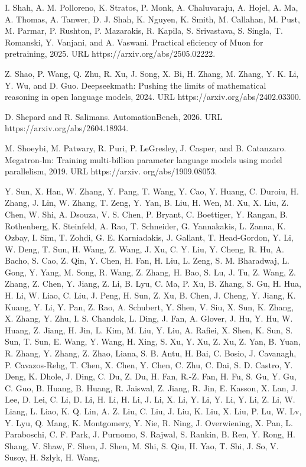 \documentclass[
  10
]{article}
\begin{document}
I. Shah, A. M. Polloreno, K. Stratos, P. Monk, A. Chaluvaraju, A. Hojel,
A. Ma, A. Thomas, A. Tanwer, D. J. Shah, K. Nguyen, K. Smith, M.
Callahan, M. Pust, M. Parmar, P. Rushton, P. Mazarakis, R. Kapila, S.
Srivastava, S. Singla, T. Romanski, Y. Vanjani, and A. Vaswani.
Practical eficiency of Muon for pretraining, 2025. URL
https://arxiv.org/abs/2505.02222.

Z. Shao, P. Wang, Q. Zhu, R. Xu, J. Song, X. Bi, H. Zhang, M. Zhang, Y.
K. Li, Y. Wu, and D. Guo. Deepseekmath: Pushing the limits of
mathematical reasoning in open language models, 2024. URL
https://arxiv.org/abs/2402.03300.

D. Shepard and R. Salimans. AutomationBench, 2026. URL
https://arxiv.org/abs/2604.18934.

M. Shoeybi, M. Patwary, R. Puri, P. LeGresley, J. Casper, and B.
Catanzaro. Megatron-lm: Training multi-billion parameter language models
using model parallelism, 2019. URL https://arxiv. org/abs/1909.08053.

Y. Sun, X. Han, W. Zhang, Y. Pang, T. Wang, Y. Cao, Y. Huang, C. Duroiu,
H. Zhang, J. Lin, W. Zhang, T. Zeng, Y. Yan, B. Liu, H. Wen, M. Xu, X.
Liu, Z. Chen, W. Shi, A. Dsouza, V. S. Chen, P. Bryant, C. Boettiger, Y.
Rangan, B. Rothenberg, K. Steinfeld, A. Rao, T. Schneider, G.
Yannakakis, L. Zanna, K. Ozbay, I. Sim, T. Zohdi, G. E. Karniadakis, J.
Gallant, T. Head-Gordon, Y. Li, W. Deng, T. Sun, H. Wang, Z. Wang, J.
Xu, C. Y. Liu, Y. Cheng, R. Hu, A. Bacho, S. Cao, Z. Qin, Y. Chen, H.
Fan, H. Liu, L. Zeng, S. M. Bharadwaj, L. Gong, Y. Yang, M. Song, R.
Wang, Z. Zhang, H. Bao, S. Lu, J. Tu, Z. Wang, Z. Zhang, Z. Chen, Y.
Jiang, Z. Li, B. Lyu, C. Ma, P. Xu, B. Zhang, S. Gu, H. Hua, H. Li, W.
Liao, C. Liu, J. Peng, H. Sun, Z. Xu, B. Chen, J. Cheng, Y. Jiang, K.
Kuang, Y. Li, Y. Pan, Z. Rao, A. Schubert, Y. Shen, V. Siu, X. Sun, K.
Zhang, X. Zhang, Y. Zhu, I. S. Chandok, L. Ding, J. Fan, A. Glover, J.
Hu, Y. Hu, W. Huang, Z. Jiang, H. Jin, L. Kim, M. Liu, Y. Liu, A.
Rafiei, X. Shen, K. Sun, S. Sun, T. Sun, E. Wang, Y. Wang, H. Xing, S.
Xu, Y. Xu, Z. Xu, Z. Yan, B. Yuan, R. Zhang, Y. Zhang, Z. Zhao, Liana,
S. B. Antu, H. Bai, C. Bosio, J. Cavanagh, P. Cavazos-Rehg, T. Chen, X.
Chen, Y. Chen, C. Zhu, C. Dai, S. D. Castro, Y. Deng, K. Dhole, J. Ding,
C. Du, Z. Du, H. Fan, R.-Z. Fan, H. Fu, S. Gu, Y. Gu, C. Guo, B. Huang,
B. Huang, R. Jaiswal, Z. Jiang, R. Jin, E. Kasson, X. Lan, J. Lee, D.
Lei, C. Li, D. Li, H. Li, H. Li, J. Li, X. Li, Y. Li, Y. Li, Y. Li, Z.
Li, W. Liang, L. Liao, K. Q. Lin, A. Z. Liu, C. Liu, J. Liu, K. Liu, X.
Liu, P. Lu, W. Lv, Y. Lyu, Q. Mang, K. Montgomery, Y. Nie, R. Ning, J.
Overwiening, X. Pan, L. Paraboschi, C. F. Park, J. Purnomo, S. Rajwal,
S. Rankin, B. Ren, Y. Rong, H. Shang, V. Shaw, F. Shen, J. Shen, M. Shi,
S. Qiu, H. Yao, T. Shi, J. So, V. Susoy, H. Szlyk, H. Wang,
\end{document}
